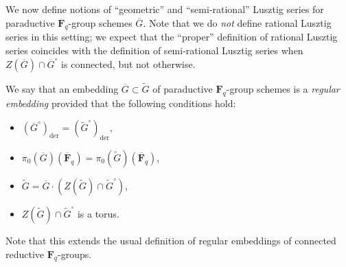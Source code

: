 \documentclass[reqno]{amsart}
\numberwithin{equation}{subsection}
\newcommand{\F}{\mathbf{F}}
\newcommand{\wt}[1]{\widetilde{#1}}
\newcommand{\ol}[1]{\overline{#1}}
\DeclareMathOperator{\der}{der}
\theoremstyle{remark}
\numberwithin{equation}{subsection}
\numberwithin{figure}{subsection}
\begin{document}
We now define notions of ``geometric'' and ``semi-rational'' Lusztig series for paraductive $\F_q$-group schemes $\ol G$. Note that we do \emph{not} define rational Lusztig series in this setting; we expect that the ``proper'' definition of rational Lusztig series coincides with the definition of semi-rational Lusztig series when $Z(\ol G) \cap \ol G^\circ$ is connected, but not otherwise.

We say that an embedding $\ol G \subset \wt G$ of paraductive $\F_q$-group schemes is a \emph{regular embedding} provided that the following conditions hold:
\begin{itemize}
    \item $(\ol G^\circ)_{\der} = (\wt G^\circ)_{\der}$,
    \item $\pi_0(\ol G)(\ol\F_q) = \pi_0(\wt G)(\ol\F_q)$,
    \item $\wt G = \ol G \cdot (Z(\wt G) \cap \wt G^\circ)$,
    \item $Z(\wt G) \cap \wt G^\circ$ is a torus.
\end{itemize}
Note that this extends the usual definition of regular embeddings of connected reductive $\F_q$-groups.
\end{document}
